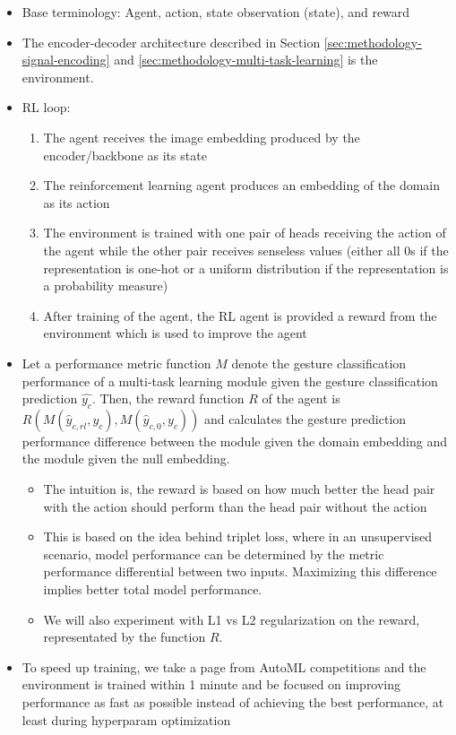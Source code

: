 \begin{itemize}
	\item Base terminology: Agent, action, state observation (state), and reward
	\item The encoder-decoder architecture described in Section \ref{sec:methodology-signal-encoding} and \ref{sec:methodology-multi-task-learning} is the environment.
	\item RL loop:
	\begin{enumerate}
		\item The agent receives the image embedding produced by the encoder/backbone as its state
		\item The reinforcement learning agent produces an embedding of the domain as its action
		\item The environment is trained with one pair of heads receiving the action of the agent while the other pair receives senseless values (either all 0s if the representation is one-hot or a uniform distribution if the representation is a probability measure)
		\item After training of the agent, the RL agent is provided a reward from the environment which is used to improve the agent
	\end{enumerate}
	\item Let a performance metric function $M$ denote the gesture classification performance of a multi-task learning module given the gesture classification prediction $\hat{y_{c}}$. Then, the reward function $R$ of the agent is $R\left(M\left(\hat{y}_{c,rl}, y_c\right),M\left(\hat{y}_{c,0}, y_c\right)\right)$ and calculates the gesture prediction performance difference between the module given the domain embedding and the module given the null embedding.
	\begin{itemize}
		\item The intuition is, the reward is based on how much better the head pair with the action should perform than the head pair without the action
		\item This is based on the idea behind triplet loss, where in an unsupervised scenario, model performance can be determined by the metric performance differential between two inputs. Maximizing this difference implies better total model performance.
		\item We will also experiment with L1 vs L2 regularization on the reward, representated by the function $R$.
	\end{itemize}
	\item To speed up training, we take a page from AutoML competitions and the environment is trained within 1 minute and be focused on improving performance as fast as possible instead of achieving the best performance, at least during hyperparam optimization

\end{itemize}
